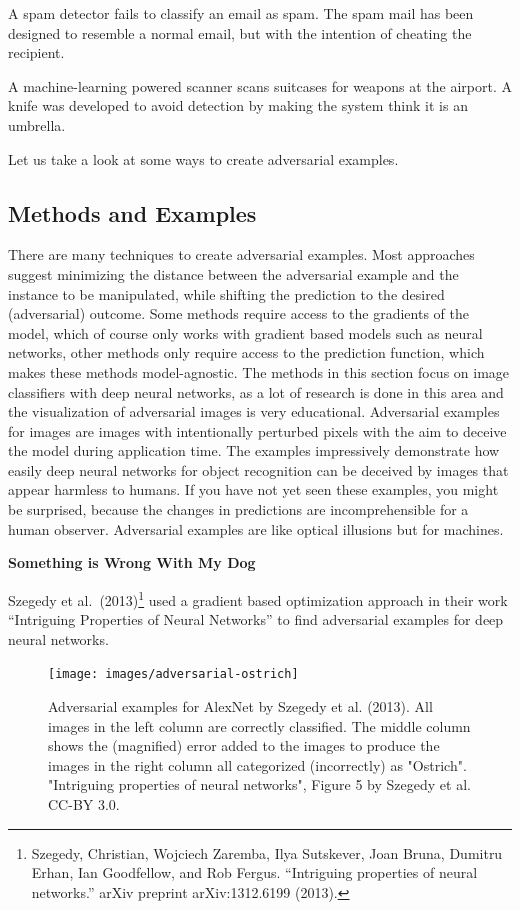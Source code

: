\documentclass[
  10pt,
]{scrbook}
\begin{document}
A spam detector fails to classify an email as spam.
The spam mail has been designed to resemble a normal email, but with the intention of cheating the recipient.

A machine-learning powered scanner scans suitcases for weapons at the airport.
A knife was developed to avoid detection by making the system think it is an umbrella.

Let us take a look at some ways to create adversarial examples.

\hypertarget{methods-and-examples}{%
\subsection{Methods and Examples}\label{methods-and-examples}}

There are many techniques to create adversarial examples.
Most approaches suggest minimizing the distance between the adversarial example and the instance to be manipulated, while shifting the prediction to the desired (adversarial) outcome.
Some methods require access to the gradients of the model, which of course only works with gradient based models such as neural networks, other methods only require access to the prediction function, which makes these methods model-agnostic.
The methods in this section focus on image classifiers with deep neural networks, as a lot of research is done in this area and the visualization of adversarial images is very educational.
Adversarial examples for images are images with intentionally perturbed pixels with the aim to deceive the model during application time.
The examples impressively demonstrate how easily deep neural networks for object recognition can be deceived by images that appear harmless to humans.
If you have not yet seen these examples, you might be surprised, because the changes in predictions are incomprehensible for a human observer.
Adversarial examples are like optical illusions but for machines.

\textbf{Something is Wrong With My Dog}

Szegedy et al.~(2013)\footnote{Szegedy, Christian, Wojciech Zaremba, Ilya Sutskever, Joan Bruna, Dumitru Erhan, Ian Goodfellow, and Rob Fergus. ``Intriguing properties of neural networks.'' arXiv preprint arXiv:1312.6199 (2013).} used a gradient based optimization approach in their work ``Intriguing Properties of Neural Networks'' to find adversarial examples for deep neural networks.

\begin{figure}

{\centering \texttt{[image: images/adversarial-ostrich]} 

}

\caption{Adversarial examples for AlexNet by Szegedy et al. (2013). All images in the left column are correctly classified. The middle column shows the (magnified) error added to the images to produce the images in the right column all categorized (incorrectly) as "Ostrich". "Intriguing properties of neural networks", Figure 5 by Szegedy et al. CC-BY 3.0.}\label{fig:adversarial-ostrich}
\end{figure}
\end{document}
